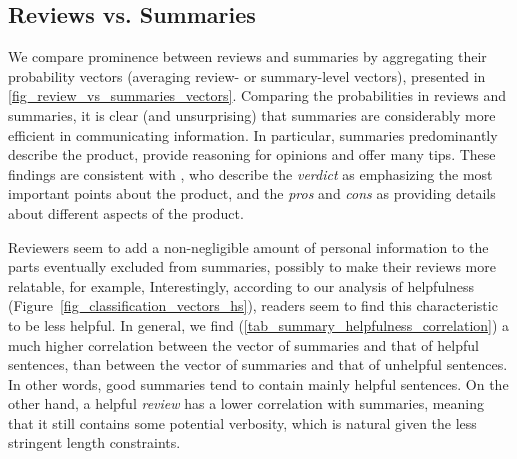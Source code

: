 \subsection{Reviews vs. Summaries}
We compare \taxtype{} prominence between reviews and summaries by aggregating their
probability vectors (averaging review- or summary-level \taxtype{} vectors),
presented in \autoref{fig_review_vs_summaries_vectors}.
Comparing the \taxtype{} probabilities in reviews and summaries, it is clear (and unsurprising) that summaries are considerably more efficient in communicating information. 
In particular, summaries predominantly describe the product, provide reasoning for opinions and offer many tips.
These findings are consistent with \citet{brazinskas2021amasum}, who describe the \emph{verdict} as emphasizing the most important points about the product, and the \emph{pros} and \emph{cons} as providing details about different aspects of the product.

Reviewers seem to add a non-negligible amount of personal information to the parts eventually excluded from summaries, possibly to make their reviews more relatable, for example, 
Interestingly, according to our analysis of helpfulness (Figure~\ref{fig_classification_vectors_hs}), readers seem to find this characteristic to be less helpful.
In general, we find (\autoref{tab_summary_helpfulness_correlation}) a much higher correlation between the vector of summaries and that of helpful sentences, than between the vector of summaries and that of unhelpful sentences.
In other words, good summaries tend to contain mainly helpful sentences. 
On the other hand, a helpful \textit{review} has a lower correlation with summaries, meaning that it still contains some potential verbosity, which is natural given the less stringent length constraints.




